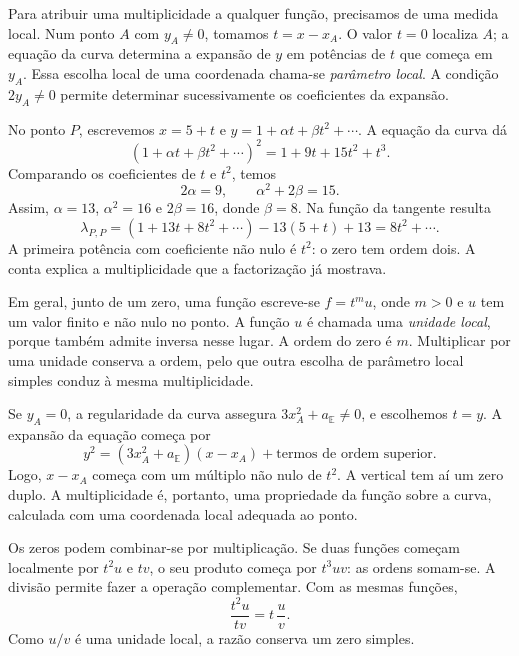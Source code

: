 Para atribuir uma multiplicidade a qualquer função, precisamos de uma
medida local. Num ponto \(A\) com \(y_A\ne0\), tomamos
\(t=x-x_A\). O valor \(t=0\) localiza \(A\); a equação da curva
determina a expansão de \(y\) em potências de \(t\) que começa em
\(y_A\). Essa escolha local de uma coordenada chama-se
\emph{parâmetro local}. A condição \(2y_A\ne0\) permite determinar
sucessivamente os coeficientes da expansão.

No ponto \(P\), escrevemos \(x=5+t\) e
\(y=1+\alpha t+\beta t^2+\cdots\). A equação da curva dá
\[
 (1+\alpha t+\beta t^2+\cdots)^2
 =1+9t+15t^2+t^3.
\]
Comparando os coeficientes de \(t\) e \(t^2\), temos
\[
 2\alpha=9,\qquad \alpha^2+2\beta=15.
\]
Assim, \(\alpha=13\), \(\alpha^2=16\) e
\(2\beta=16\), donde \(\beta=8\). Na função da tangente resulta
\[
 \lambda_{P,P}
 =(1+13t+8t^2+\cdots)-13(5+t)+13
 =8t^2+\cdots.
\]
A primeira potência com coeficiente não nulo é \(t^2\): o zero tem
ordem dois. A conta explica a multiplicidade que a factorização já
mostrava.

Em geral, junto de um zero, uma função escreve-se
\(f=t^m u\), onde \(m>0\) e \(u\) tem um valor finito e não nulo
no ponto. A função \(u\) é chamada uma \emph{unidade local}, porque
também admite inversa nesse lugar. A ordem do zero é \(m\). Multiplicar
por uma unidade conserva a ordem, pelo que outra escolha de parâmetro
local simples conduz à mesma multiplicidade.

Se \(y_A=0\), a regularidade da curva assegura
\(3x_A^2+a_{\mathbb E}\ne0\), e escolhemos \(t=y\). A expansão
da equação começa por
\[
 y^2=(3x_A^2+a_{\mathbb E})(x-x_A)+\text{termos de ordem superior}.
\]
Logo, \(x-x_A\) começa com um múltiplo não nulo de \(t^2\).
A vertical tem aí um zero duplo. A multiplicidade é, portanto, uma
propriedade da função sobre a curva, calculada com uma coordenada local
adequada ao ponto.


Os zeros podem combinar-se por multiplicação. Se duas funções começam
localmente por \(t^2u\) e \(tv\), o seu produto começa por
\(t^3uv\): as ordens somam-se. A divisão permite fazer a operação
complementar. Com as mesmas funções,
\[
 \frac{t^2u}{tv}=t\,\frac uv.
\]
Como \(u/v\) é uma unidade local, a razão conserva um zero simples.

